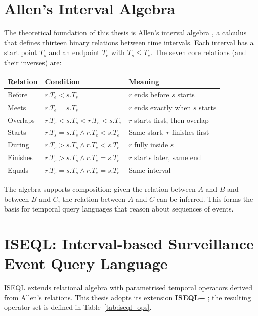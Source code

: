 \section{Allen's Interval Algebra}
\label{sec:allen}

The theoretical foundation of this thesis is Allen's interval algebra \citep{allen1983}, a calculus that defines thirteen binary relations between time intervals. Each interval has a start point $T_s$ and an endpoint $T_e$ with $T_s \le T_e$. The seven core relations (and their inverses) are:

\begin{center}
\begin{tabular}{lll}
\toprule
Relation & Condition & Meaning \\
\midrule
Before & $r.T_e < s.T_s$ & $r$ ends before $s$ starts \\
Meets & $r.T_e = s.T_s$ & $r$ ends exactly when $s$ starts \\
Overlaps & $r.T_s < s.T_s < r.T_e < s.T_e$ & $r$ starts first, then overlap \\
Starts & $r.T_s = s.T_s \land r.T_e < s.T_e$ & Same start, $r$ finishes first \\
During & $r.T_s > s.T_s \land r.T_e < s.T_e$ & $r$ fully inside $s$ \\
Finishes & $r.T_s > s.T_s \land r.T_e = s.T_e$ & $r$ starts later, same end \\
Equals & $r.T_s = s.T_s \land r.T_e = s.T_e$ & Same interval \\
\bottomrule
\end{tabular}
\end{center}

The algebra supports composition: given the relation between $A$ and $B$ and between $B$ and $C$, the relation between $A$ and $C$ can be inferred. This forms the basis for temporal query languages that reason about sequences of events.

\section{ISEQL: Interval-based Surveillance Event Query Language}
\label{sec:iseql}

ISEQL \citep{helmer2016highlevel, persia2017interactive} extends relational algebra with parametrised temporal operators derived from Allen's relations. This thesis adopts its extension \textbf{ISEQL+} \citep{persia2026iseqlplus}; the resulting operator set is defined in Table~\ref{tab:iseql_ops}.

